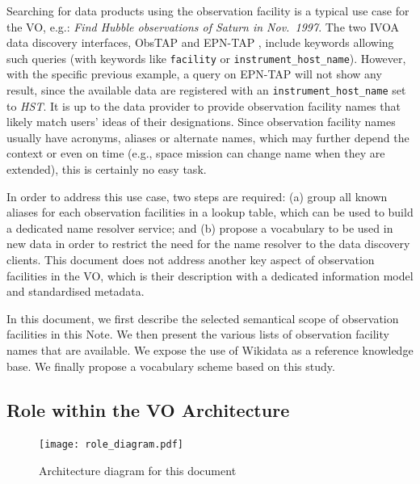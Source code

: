 \documentclass[11pt,a4paper]{ivoa}
\begin{document}
Searching for data products using the observation facility is a 
typical use case for the VO, e.g.: \emph{Find Hubble observations
of Saturn in Nov.\ 1997}. The two IVOA data discovery interfaces, 
ObsTAP \citep{2017ivoa.spec.0509L} and EPN-TAP \citep{ivoa:epntap}, 
include keywords allowing such queries (with keywords like 
\texttt{facility} or \texttt{instrument\_host\_name}). However, with 
the specific previous example, a query on EPN-TAP will not show any 
result, since the available data are registered with an 
\texttt{instrument\_host\_name} set to \emph{HST}. It is up to the 
data provider to provide observation facility names that likely match
users' ideas of their designations.  Since
observation facility names usually have acronyms, aliases or alternate 
names, which may further depend the context or even on 
time (e.g., space mission can change name when they are extended), this
is certainly no easy task.

In order to address this use case, two steps are required: (a) group
all known aliases for each observation facilities in a lookup table, 
which can be used to build a dedicated name resolver service; and 
(b) propose a vocabulary to be used in new data in order to restrict the
need for the name resolver to the data discovery clients.
This document does not address another key
aspect of observation facilities in the VO, which is their 
description with a dedicated information model and standardised 
metadata.

In this document, we first describe the selected semantical scope of 
observation facilities in this Note. We then present the various 
lists of observation facility names that are available. We expose the 
use of Wikidata as a reference knowledge base. We finally propose a 
vocabulary scheme based on this study. 

\subsection{Role within the VO Architecture}

\begin{figure}
\centering


\texttt{[image: role\_diagram.pdf]}
\caption{Architecture diagram for this document}
\label{fig:archdiag}
\end{figure}
\end{document}
